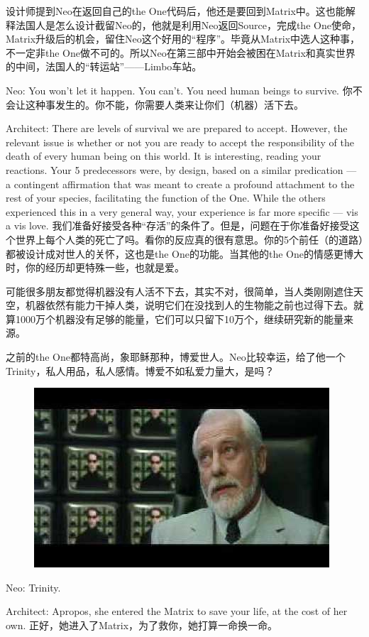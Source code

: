 \documentclass{ctexart}
\begin{document}
设计师提到Neo在返回自己的the One代码后，他还是要回到Matrix中。这也能解释法国人是怎么设计截留Neo的，他就是利用Neo返回Source，完成the One使命，Matrix升级后的机会，留住Neo这个好用的“程序”。毕竟从Matrix中选人这种事，不一定非the One做不可的。所以Neo在第三部中开始会被困在Matrix和真实世界的中间，法国人的“转运站”——Limbo车站。

Neo: You won't let it happen. You can't. You need human beings to survive. 你不会让这种事发生的。你不能，你需要人类来让你们（机器）活下去。

Architect: There are levels of survival we are prepared to accept. However, the relevant issue is whether or not you are ready to accept the responsibility of the death of every human being on this world. It is interesting, reading your reactions. Your 5 predecessors were, by design, based on a similar predication --- a contingent affirmation that was meant to create a profound attachment to the rest of your species, facilitating the function of the One. While the others experienced this in a very general way, your experience is far more specific --- vis a vis love. 我们准备好接受各种“存活”的条件了。但是，问题在于你准备好接受这个世界上每个人类的死亡了吗。看你的反应真的很有意思。你的5个前任（的道路）都被设计成对世人的关怀，这也是the One的功能。当其他的the One的情感更博大时，你的经历却更特殊一些，也就是爱。

可能很多朋友都觉得机器没有人活不下去，其实不对，很简单，当人类刚刚遮住天空，机器依然有能力干掉人类，说明它们在没找到人的生物能之前也过得下去。就算1000万个机器没有足够的能量，它们可以只留下10万个，继续研究新的能量来源。

之前的the One都特高尚，象耶稣那种，博爱世人。Neo比较幸运，给了他一个Trinity，私人用品，私人感情。博爱不如私爱力量大，是吗？

\begin{figure}[htb]
\centering
\includegraphics[width=0.5\linewidth]{fig/read_reloaded-165}
\end{figure}

Neo: Trinity.

Architect: Apropos, she entered the Matrix to save your life, at the cost of her own. 正好，她进入了Matrix，为了救你，她打算一命换一命。
\end{document}
